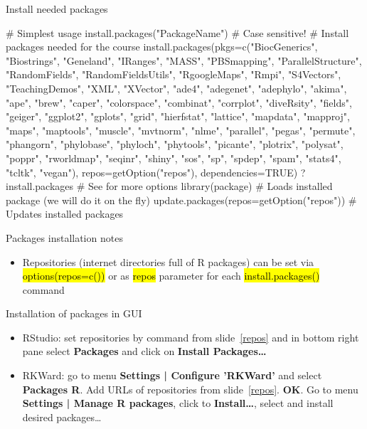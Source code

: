 \documentclass[compress, ucs, xelatex, 11pt, xcolor=svgnames,
  hyperref={
    bookmarks=true,
    unicode=true,
    colorlinks=true,
    pdftitle={Molecular data in R},
    plainpages=false,
    pdfauthor={Vojtech Zeisek},
    pdfsubject={Course about phylogeny and evolution in R},
    pdfcreator={XeLaTeX},
    pdfkeywords={R, evolution, phylogeny, molecular data},
    linkcolor=Tomato,
    anchorcolor=SaddleBrown,
    citecolor=Goldenrod,
    filecolor=DarkMagenta,
    menucolor=Sienna,
    urlcolor=DarkTurquoise,
    pdftex},
  url={hyphens, lowtilde} %
  ]{beamer}
\renewcommand{\texttt}[1]{\hl{\ttfamily #1}}
\begin{document}
\begin{frame}[fragile]{Install needed packages}
  \begin{spluscode}
    # Simplest usage
    install.packages("PackageName") # Case sensitive!
    # Install packages needed for the course
    install.packages(pkgs=c("BiocGenerics", "Biostrings", "Geneland",
      "IRanges", "MASS", "PBSmapping", "ParallelStructure", "RandomFields",
      "RandomFieldsUtils", "RgoogleMaps", "Rmpi", "S4Vectors",
      "TeachingDemos", "XML", "XVector", "ade4", "adegenet", "adephylo",
      "akima", "ape", "brew", "caper", "colorspace", "combinat", "corrplot",
      "diveRsity", "fields", "geiger", "ggplot2", "gplots", "grid",
      "hierfstat", "lattice", "mapdata", "mapproj", "maps", "maptools",
      "muscle", "mvtnorm", "nlme", "parallel", "pegas", "permute",
      "phangorn", "phylobase", "phyloch", "phytools", "picante", "plotrix",
      "polysat", "poppr", "rworldmap", "seqinr", "shiny", "sos", "sp",
      "spdep", "spam", "stats4", "tcltk", "vegan"),
      repos=getOption("repos"), dependencies=TRUE)
    ?install.packages # See for more options
    library(package) # Loads installed package (we will do it on the fly)
    update.packages(repos=getOption("repos")) # Updates installed packages
  \end{spluscode}
\end{frame}

\begin{frame}{Packages installation notes}
  \begin{itemize}
    \item Repositories (internet directories full of R packages) can be set via \texttt{options(repos=c())} or as \texttt{repos} parameter for each \texttt{install.packages()} command
  \end{itemize}
  \begin{block}{Installation of packages in GUI}
    \begin{itemize}
      \item RStudio: set repositories by command from slide~\ref{repos} and in bottom right pane select \textbf{Packages} and click on \textbf{Install Packages\ldots}
      \item RKWard: go to menu \textbf{Settings | Configure 'RKWard'} and select \textbf{Packages R}. Add URLs of repositories from slide~\ref{repos}. \textbf{OK}. Go to menu \textbf{Settings | Manage R packages}, click to \textbf{Install\ldots}, select and install desired packages\ldots
    \end{itemize}
  \end{block}
\end{frame}
\end{document}
